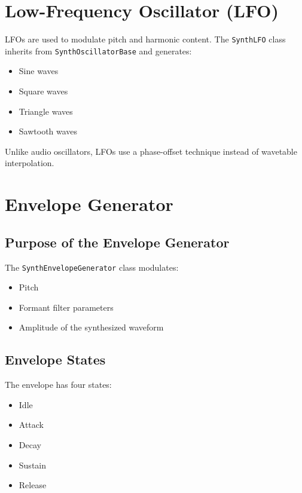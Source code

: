 \section{Low-Frequency Oscillator (LFO)}

LFOs are used to modulate pitch and harmonic content. The \texttt{SynthLFO} class inherits from \texttt{SynthOscillatorBase} and generates:

\begin{itemize}
    \item Sine waves
    \item Square waves
    \item Triangle waves
    \item Sawtooth waves
\end{itemize}

Unlike audio oscillators, LFOs use a phase-offset technique instead of wavetable interpolation.

\section{Envelope Generator}

\subsection{Purpose of the Envelope Generator}

The \texttt{SynthEnvelopeGenerator} class modulates:

\begin{itemize}
    \item Pitch
    \item Formant filter parameters
    \item Amplitude of the synthesized waveform
\end{itemize}

\subsection{Envelope States}

The envelope has four states:

\begin{itemize}
    \item Idle
    \item Attack
    \item Decay
    \item Sustain
    \item Release
\end{itemize}

